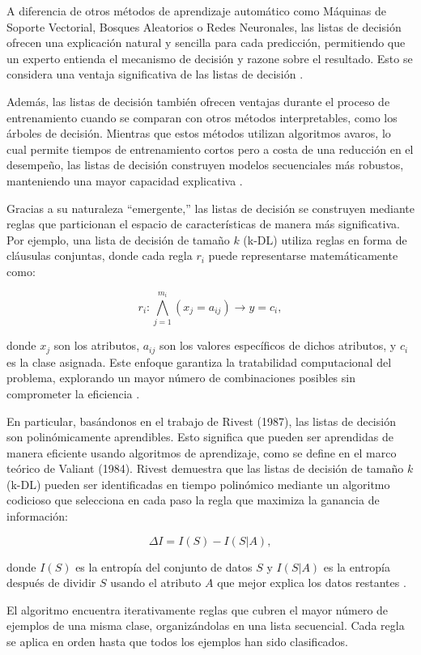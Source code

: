 A diferencia de otros métodos de aprendizaje automático como Máquinas de Soporte Vectorial, Bosques Aleatorios o Redes Neuronales, las listas de decisión ofrecen una explicación natural y sencilla para cada predicción, permitiendo que un experto entienda el mecanismo de decisión y razone sobre el resultado. Esto se considera una ventaja significativa de las listas de decisión \cite{Letham-2015}.

Además, las listas de decisión también ofrecen ventajas durante el proceso de entrenamiento cuando se comparan con otros métodos interpretables, como los árboles de decisión. Mientras que estos métodos utilizan algoritmos avaros, lo cual permite tiempos de entrenamiento cortos pero a costa de una reducción en el desempeño, las listas de decisión construyen modelos secuenciales más robustos, manteniendo una mayor capacidad explicativa \cite{Liu-2015}.

Gracias a su naturaleza “emergente,” las listas de decisión se construyen mediante reglas que particionan el espacio de características de manera más significativa. Por ejemplo, una lista de decisión de tamaño \(k\) (k-DL) utiliza reglas en forma de cláusulas conjuntas, donde cada regla \(r_i\) puede representarse matemáticamente como:

\[
r_i : \bigwedge_{j=1}^{m_i} (x_j = a_{ij}) \rightarrow y = c_i,
\]

donde \(x_j\) son los atributos, \(a_{ij}\) son los valores específicos de dichos atributos, y \(c_i\) es la clase asignada. Este enfoque garantiza la tratabilidad computacional del problema, explorando un mayor número de combinaciones posibles sin comprometer la eficiencia \cite{Letham-2015}.

En particular, basándonos en el trabajo de Rivest (1987), las listas de decisión son polinómicamente aprendibles. Esto significa que pueden ser aprendidas de manera eficiente usando algoritmos de aprendizaje, como se define en el marco teórico de Valiant (1984). Rivest demuestra que las listas de decisión de tamaño \(k\) (k-DL) pueden ser identificadas en tiempo polinómico mediante un algoritmo codicioso que selecciona en cada paso la regla que maximiza la ganancia de información:

\[
\Delta I = I(S) - I(S|A),
\]

donde \(I(S)\) es la entropía del conjunto de datos \(S\) y \(I(S|A)\) es la entropía después de dividir \(S\) usando el atributo \(A\) que mejor explica los datos restantes \cite{Rivest-1987}.

El algoritmo encuentra iterativamente reglas que cubren el mayor número de ejemplos de una misma clase, organizándolas en una lista secuencial. Cada regla se aplica en orden hasta que todos los ejemplos han sido clasificados.


